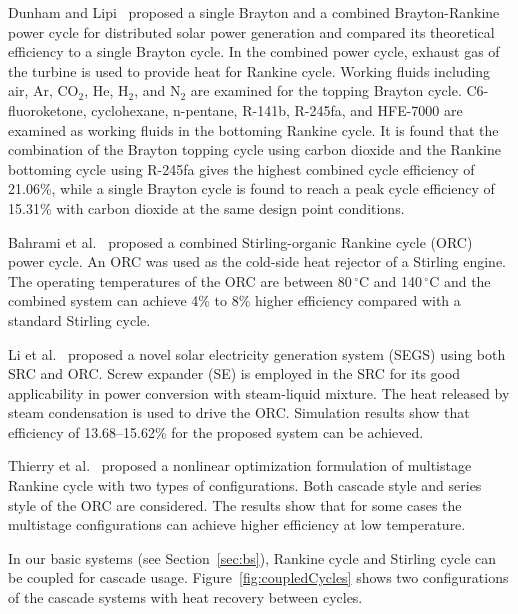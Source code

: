 Dunham and Lipi~\cite{Dunham2013} proposed a single Brayton and a combined Brayton-Rankine power cycle for distributed solar power generation and compared its theoretical efficiency to a single Brayton cycle. In the combined power cycle, exhaust gas of the turbine is used to provide heat for Rankine cycle. Working fluids including air, Ar, CO$_2$, He, H$_2$, and N$_2$ are examined for the topping Brayton cycle. C6-fluoroketone, cyclohexane, n-pentane, R-141b, R-245fa, and HFE-7000 are examined as working fluids in the bottoming Rankine cycle. It is found that the combination of the Brayton topping cycle using carbon dioxide and the Rankine bottoming cycle using R-245fa gives the highest combined cycle efficiency of 21.06\%, while a single Brayton cycle is found to reach a peak cycle efficiency of 15.31\% with carbon dioxide at the same design point conditions.

Bahrami et al.~\cite{Bahrami2013} proposed a combined Stirling-organic Rankine cycle (ORC) power cycle. An ORC was used as the cold-side heat rejector of a Stirling engine. The operating temperatures of the ORC are between 80$\,\mathrm{^\circ C}$ and 140$\,\mathrm{^\circ C}$ and the combined system can achieve 4\% to 8\% higher efficiency compared with a standard Stirling cycle.

Li et al.~\cite{Li2016a} proposed a novel solar electricity generation system (SEGS) using both SRC and ORC. Screw expander (SE) is employed in the SRC for its good applicability in power conversion with steam-liquid mixture. The heat released by steam condensation is used to drive the ORC. Simulation results show that efficiency of 13.68–15.62\% for the proposed system can be achieved.

Thierry et al.~\cite{Thierry2016} proposed a nonlinear optimization formulation of multistage Rankine cycle with two types of configurations. Both cascade style and series style of the ORC are considered. The results show that for some cases the multistage configurations can achieve higher efficiency at low temperature.

In our basic systems (see Section~\ref{sec:bs}), Rankine cycle and Stirling cycle can be coupled for cascade usage. Figure~\ref{fig:coupledCycles} shows two configurations of the cascade systems with heat recovery between cycles.

